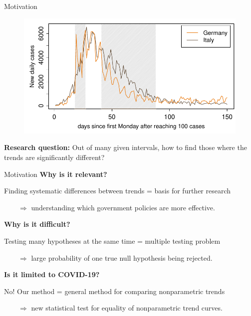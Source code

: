 \documentclass[10pt, handout]{beamer}
\begin{document}
\begin{frame}{Motivation}
{\begin{figure}
  	\end{figure}}	
	{\onslide<4->
	\vspace{-46,81mm}
	\begin{figure}
    		\centering
    		\includegraphics[height=0.45\textheight]{plots/Germany_and_Italy_2.pdf}
  	\end{figure}}	
\vspace{-3mm}
{\textbf{Research question:}
	Out of many given intervals, how to find those where the trends are significantly different?}


\end{frame}

\begin{frame}{Motivation}
\vspace{-4mm}
\textbf{Why is it relevant?}

Finding systematic differences between trends = basis for further research

$\quad \quad \Rightarrow$ understanding which government policies are more effective.\pause

\vspace{3mm}

\textbf{Why is it difficult?}	

Testing many hypotheses at the same time = multiple testing problem

$\quad \quad \Rightarrow$ large probability of one true null hypothesis being rejected.\pause

\vspace{3mm}

\textbf{Is it limited to COVID-19?}

No! Our method = general method for comparing nonparametric trends

$\quad \quad \Rightarrow$ new statistical test for equality of nonparametric trend curves.
 
\end{frame}
\end{document}
